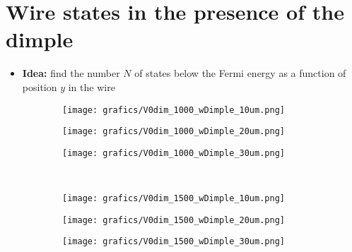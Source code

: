 \documentclass[11pt]{article}
\begin{document}
\newpage
\section{Wire states in the presence of the dimple}

\begin{itemize}
	\item \textbf{Idea:} find the number $N$ of states below the Fermi energy as a function of position $y$ in the wire
\end{itemize}

\begin{figure}
	\centering
	\begin{subfigure}[b]{0.3\textwidth}
		\texttt{[image: grafics/V0dim\_1000\_wDimple\_10um.png]}
		\caption{}
		\label{fig:v1k_w10um}
	\end{subfigure}
	\begin{subfigure}[b]{0.3\textwidth}
		\texttt{[image: grafics/V0dim\_1000\_wDimple\_20um.png]}
		\caption{}
		\label{fig:v1k_w20um}
	\end{subfigure}
	\begin{subfigure}[b]{0.3\textwidth}
		\texttt{[image: grafics/V0dim\_1000\_wDimple\_30um.png]}
		\caption{}
		\label{fig:v1k_w30um}
	\end{subfigure} \\
	
	\begin{subfigure}[b]{0.3\textwidth}
		\texttt{[image: grafics/V0dim\_1500\_wDimple\_10um.png]}
		\caption{}
		\label{fig:v15k_w10um}
	\end{subfigure}
	\begin{subfigure}[b]{0.3\textwidth}
		\texttt{[image: grafics/V0dim\_1500\_wDimple\_20um.png]}
		\caption{}
		\label{fig:v15k_w20um}
	\end{subfigure}
	\begin{subfigure}[b]{0.3\textwidth}
		\texttt{[image: grafics/V0dim\_1500\_wDimple\_30um.png]}
		\caption{}
		\label{fig:v15k_w30um}
	\end{subfigure} \\
	

\end{figure}
\end{document}

